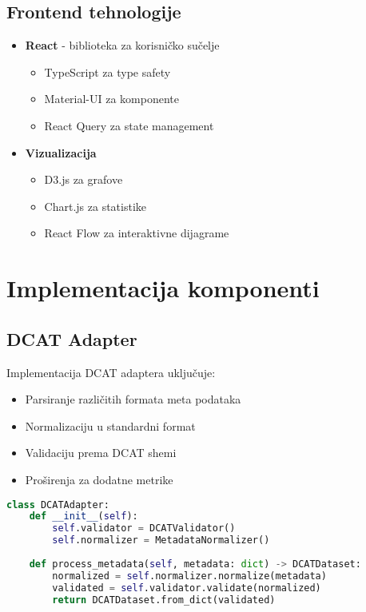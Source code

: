 \subsection{Frontend tehnologije}
\begin{itemize}
    \item \textbf{React} - biblioteka za korisničko sučelje
    \begin{itemize}
        \item TypeScript za type safety
        \item Material-UI za komponente
        \item React Query za state management
    \end{itemize}
    
    \item \textbf{Vizualizacija}
    \begin{itemize}
        \item D3.js za grafove
        \item Chart.js za statistike
        \item React Flow za interaktivne dijagrame
    \end{itemize}
\end{itemize}

\section{Implementacija komponenti}
\label{sec:components}

\subsection{DCAT Adapter}
Implementacija DCAT adaptera uključuje:
\begin{itemize}
    \item Parsiranje različitih formata meta podataka
    \item Normalizaciju u standardni format
    \item Validaciju prema DCAT shemi
    \item Proširenja za dodatne metrike
\end{itemize}

\begin{lstlisting}[language=Python, caption=Implementacija DCAT adaptera]
class DCATAdapter:
    def __init__(self):
        self.validator = DCATValidator()
        self.normalizer = MetadataNormalizer()
    
    def process_metadata(self, metadata: dict) -> DCATDataset:
        normalized = self.normalizer.normalize(metadata)
        validated = self.validator.validate(normalized)
        return DCATDataset.from_dict(validated)
\end{lstlisting}

